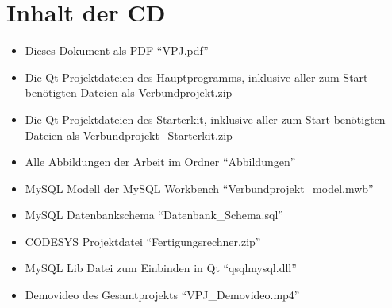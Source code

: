 
\chapter{Inhalt der CD}
\begin{itemize}
    \item Dieses Dokument als PDF "`VPJ.pdf"' \\

    \item Die Qt Projektdateien des Hauptprogramms, inklusive aller zum Start benötigten Dateien als Verbundprojekt.zip \\

    \item Die Qt Projektdateien des Starterkit, inklusive aller zum Start benötigten Dateien als Verbundprojekt\_Starterkit.zip \\
		
    \item Alle Abbildungen der Arbeit im Ordner "`Abbildungen"' \\
		
		\item MySQL Modell der MySQL Workbench "`Verbundprojekt\_model.mwb"' \\ 
		
		\item MySQL Datenbankschema "`Datenbank\_Schema.sql"' \\ 

		\item CODESYS Projektdatei "`Fertigungsrechner.zip"' \\
		
		\item MySQL Lib Datei zum Einbinden in Qt "`qsqlmysql.dll"' \\
		
		\item Demovideo des Gesamtprojekts "`VPJ\_Demovideo.mp4"' \\

\end{itemize}
